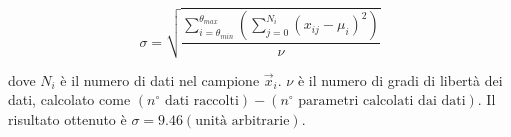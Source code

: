   \begin{equation}
    \sigma = \sqrt{
      \frac {
        \sum_{i = \theta_{min}}^{\theta_{max}} \left(
          \sum_{j = 0}^{N_i} (x_{ij} -\mu_i)^2
        \right)
      } {
        \nu
      }
    }
  \end{equation}

  \noindent dove $N_i$ è il numero di dati nel campione $\vec{x}_i$.
  $\nu$ è il numero di gradi di libertà dei dati, calcolato come
  $(n^\circ \text{ dati raccolti}) - (n^\circ \text{ parametri calcolati dai dati})$.
  Il risultato ottenuto è $\sigma = 9.46 (\text{unità arbitrarie})$.  %
\endinput
